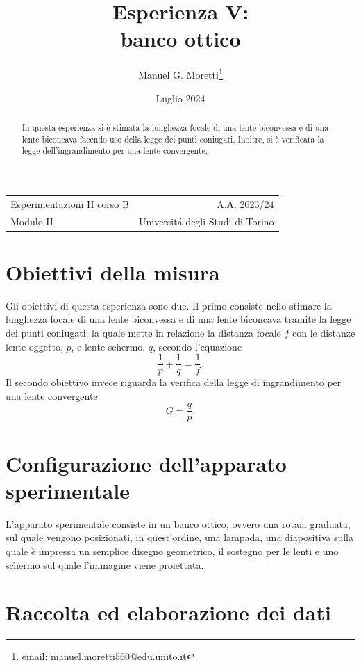 \documentclass{article}
\title{Esperienza V: \\ banco ottico}
\author{Manuel G. Moretti\footnote{email: manuel.moretti560@edu.unito.it}}
\date{Luglio 2024}
\begin{document}
\maketitle

\begin{center}
\begin{tabular}{l r}
Esperimentazioni II corso B & A.A. 2023/24 \\
Modulo II & Universit\'{a} degli Studi di Torino \\
\end{tabular}
\end{center}

\begin{abstract}
In questa esperienza si è stimata la lunghezza focale di una lente biconvessa e di una lente biconcava facendo uso della legge dei punti coniugati. Inoltre, si è verificata la legge dell'ingrandimento per una lente convergente.
\end{abstract}

\section{Obiettivi della misura}
Gli obiettivi di questa esperienza sono due. Il primo consiste nello stimare la lunghezza focale di una lente biconvessa e di una lente biconcava tramite la legge dei punti coniugati, la quale mette in relazione la distanza focale $f$ con le distanze lente-oggetto, $p$, e lente-schermo, $q$, secondo l'equazione
\begin{equation}
    \label{eq:legge punti coniugati}
    \frac{1}{p}+\frac{1}{q}=\frac{1}{f}.
\end{equation}
Il secondo obiettivo invece riguarda la verifica della legge di ingrandimento per una lente convergente
\begin{equation}
    \label{eq:legge ingrandimento}
    G=\frac{q}{p}.
\end{equation}
\section{Configurazione dell'apparato sperimentale}
L'apparato sperimentale consiste in un banco ottico, ovvero una rotaia graduata, sul quale vengono posizionati, in quest'ordine, una lampada, una diapositiva sulla quale è impressa un semplice disegno geometrico, il sostegno per le lenti e uno schermo sul quale l'immagine viene proiettata.

\section{Raccolta ed elaborazione dei dati}
\end{document}
